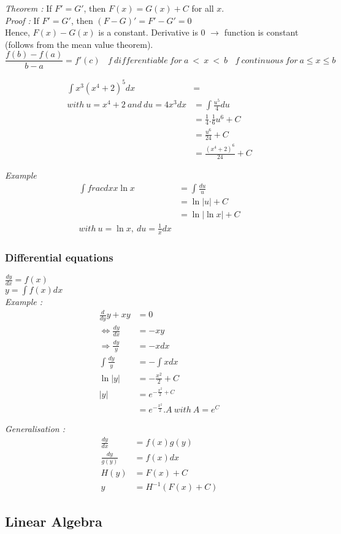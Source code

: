 \documentclass{article}
\begin{document}
    \textit{Theorem : } If $F' = G'$, then $F(x)=G(x)+C$ for all $x$.\\
    \textit{Proof :} If $F' = G'$, then $(F - G)' = F' - G' = 0$\\
    Hence, $F(x)-G(x)$ is a constant. Derivative is 0 $\rightarrow$ function is constant (follows from the mean value theorem).\\

    \[
    \label{Mean value theorem}
    \frac{f(b) - f(a)}{b-a} = f'(c)~ ~ ~ ~
    f ~differentiable ~for~ a~ < ~x ~< ~b ~ ~ ~ ~
    f ~continuous ~for~ a \leq x \leq b
    \]

    \begin{align*}
        \int x^3 (x^4 + 2)^5 dx &= \\
        with~ u = x^4 +2 ~and ~du = 4x^3 dx
        &= \int \frac{u^5}{4}du\\
        &= \frac{1}{4}.\frac{1}{6}u^6+C\\
        &= \frac{u^6}{24}+C\\
        &= \frac{(x^4 +2)^6}{24}+C
    \end{align*}

    \textit{Example}
    \begin{align*}
        \int frac{dx}{x\ln x} &= \int \frac{du}{u}\\
        &= \ln |u| + C\\
        &= \ln |\ln x| +C\\
        with~ u=\ln x, ~ du=\frac{1}{x}dx
    \end{align*}



    \subsubsection{Differential equations}

    $\frac{dy}{dx} = f(x)$\\
    $y = \int f(x)dx$\\

    \textit{Example :}\\
    \begin{align*}
        \frac{d}{dy}y + xy &= 0 \\
        \Leftrightarrow \frac{dy}{dx}&=-xy\\
        \Rightarrow \frac{dy}{y} &= -xdx\\
        \int \frac{dy}{y} &= -\int xdx \\
        \ln |y| &= - \frac{x^2}{2}+C\\
        |y| &= e^{-\frac{x^2}{2}+C} \\
        &= e^{-\frac{x^2}{2}}.A ~ with ~ A=e^C
    \end{align*}

    \textit{Generalisation :}
    \begin{align*}
        \frac{dy}{dx} &= f(x)g(y)\\
        \frac{dy}{g(y)} &= f(x)dx\\
        H(y) &= F(x) +C \\
        y &= H^{-1}(F(x)+C)
    \end{align*}



    \subsection{Linear Algebra}
\end{document}
